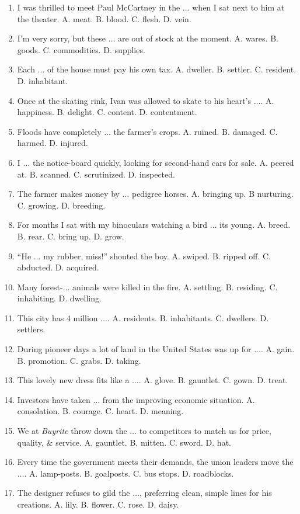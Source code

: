 \documentclass{article}
\numberwithin{equation}{section}
\begin{document}
\begin{enumerate}[leftmargin=2mm]
	\item I was thrilled to meet Paul McCartney in the $\ldots$ when I sat next to him at the theater. A. meat. B. blood. C. flesh. D. vein.
	\item I'm very sorry, but these $\ldots$ are out of stock at the moment. A. wares. B. goods. C. commodities. D. supplies.
	\item Each $\ldots$ of the house must pay his own tax. A. dweller. B. settler. C. resident. D. inhabitant.
	\item Once at the skating rink, Ivan was allowed to skate to his heart's $\ldots$. A. happiness. B. delight. C. content. D. contentment.
	\item Floods have completely $\ldots$ the farmer's crops. A. ruined. B. damaged. C. harmed. D. injured.
	\item I $\ldots$ the notice-board quickly, looking for second-hand cars for sale. A. peered at. B. scanned. C. scrutinized. D. inspected.
	\item The farmer makes money by $\ldots$ pedigree horses. A. bringing up. B nurturing. C. growing. D. breeding.
	\item For months I sat with my binoculars watching a bird $\ldots$ its young. A. breed. B. rear. C. bring up. D. grow.
	\item ``He $\ldots$ my rubber, miss!'' shouted the boy. A. swiped. B. ripped off. C. abducted. D. acquired.
	\item Many forest-$\ldots$ animals were killed in the fire. A. settling. B. residing. C. inhabiting. D. dwelling.
	\item This city has 4 million $\ldots$. A. residents. B. inhabitants. C. dwellers. D. settlers.
	\item During pioneer days a lot of land in the United States was up for $\ldots$. A. gain. B. promotion. C. grabs. D. taking.
	\item This lovely new dress fits like a $\ldots$. A. glove. B. gauntlet. C. gown. D. treat.
	\item Investors have taken $\ldots$ from the improving economic situation. A. consolation. B. courage. C. heart. D. meaning.
	\item We at \textit{Buyrite} throw down the $\ldots$ to competitors to match us for price, quality, \& service. A. gauntlet. B. mitten. C. sword. D. hat.
	\item Every time the government meets their demands, the union leaders move the $\ldots$. A. lamp-posts. B. goalposts. C. bus stops. D. roadblocks.
	\item The designer refuses to gild the $\ldots$, preferring clean, simple lines for his creations. A. lily. B. flower. C. rose. D. daisy.

\end{enumerate}
\end{document}
